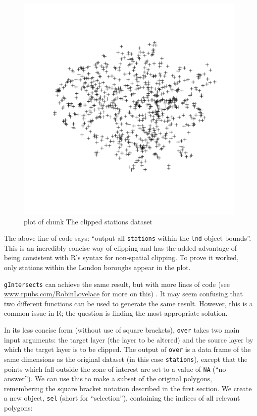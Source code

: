 \documentclass[]{article}
\begin{document}
\begin{figure}[htbp]
\centering
\includegraphics{figure/The_clipped_stations_dataset.png}
\caption{plot of chunk The clipped stations dataset}
\end{figure}

The above line of code says: ``output all \texttt{stations} within the
\texttt{lnd} object bounds''. This is an incredibly concise way of
clipping and has the added advantage of being consistent with R's syntax
for non-spatial clipping. To prove it worked, only stations within the
London boroughs appear in the plot.

\texttt{gIntersects} can achieve the same result, but with more lines of
code (see
\href{http://www.rpubs.com/RobinLovelace/11796}{www.rpubs.com/RobinLovelace}
for more on this) . It may seem confusing that two different functions
can be used to generate the same result. However, this is a common issue
in R; the question is finding the most appropriate solution.

In its less concise form (without use of square brackets), \texttt{over}
takes two main input arguments: the target layer (the layer to be
altered) and the source layer by which the target layer is to be
clipped. The output of \texttt{over} is a data frame of the same
dimensions as the original dataset (in this case \texttt{stations}),
except that the points which fall outside the zone of interest are set
to a value of \texttt{NA} (``no answer''). We can use this to make a
subset of the original polygons, remembering the square bracket notation
described in the first section. We create a new object, \texttt{sel}
(short for ``selection''), containing the indices of all relevant
polygons:
\end{document}
